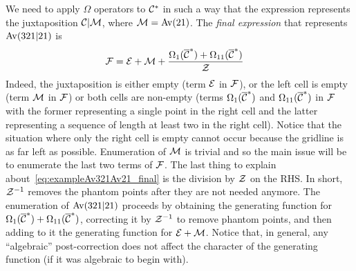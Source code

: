 \documentclass[12pt, a4paper, twoside]{report}
\begin{document}
We need to apply $\Omega$ operators to $\mathcal{C}^*$ in such a way that the expression represents the juxtaposition $\mathcal{C}|\mathcal{M}$, where $\mathcal{M} = \mathrm{Av}(21)$. The \emph{final expression} that represents $\mathrm{Av}(321|21)$ is 
\begin{align}
  \mathcal{F} &= \mathcal{E} + \mathcal{M} + \frac{\Omega_1(\overline{\mathcal{C}}^*) + \Omega_{11}(\overline{\mathcal{C}}^*)}{\mathcal{Z}}
      \label{eq:exampleAv321Av21_final}
\end{align}
Indeed, the juxtaposition is either empty (term $\mathcal{E}$ in $\mathcal{F}$), or the left cell is empty (term $\mathcal{M}$ in $\mathcal{F}$) or both cells are non-empty (terms $\Omega_1(\overline{\mathcal{C}}^*)$ and $\Omega_{11}(\overline{\mathcal{C}}^*)$ in $\mathcal{F}$ with the former representing a single point in the right cell and the latter representing a sequence of length at least two in the right cell). Notice that the situation where only the right cell is empty cannot occur because the gridline is as far left as possible. Enumeration of $\mathcal{M}$ is trivial and so the main issue will be to enumerate the last two terms of $\mathcal{F}$. The last thing to explain about~\eqref{eq:exampleAv321Av21_final} is the division by $\mathcal{Z}$ on the RHS. In short, $\mathcal{Z}^{-1}$ removes the phantom points after they are not needed anymore. The enumeration of $\mathrm{Av}(321|21)$ proceeds by obtaining the generating function for $\Omega_1(\overline{\mathcal{C}}^*) + \Omega_{11}(\overline{\mathcal{C}}^*)$, correcting it by $\mathcal{Z}^{-1}$ to remove phantom points, and then adding to it the generating function for $\mathcal{E}+\mathcal{M}$. Notice that, in general, any ``algebraic'' post-correction does not affect the character of the generating function (if it was algebraic to begin with). 
\end{document}
